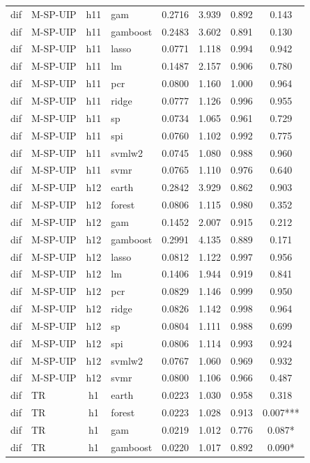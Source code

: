 \begin{ThreePartTable}
\begin{longtable}[t]{llclcccc}
dif & M-SP-UIP & h11 & gam & 0.2716 & 3.939 & 0.892 & 0.143\\
dif & M-SP-UIP & h11 & gamboost & 0.2483 & 3.602 & 0.891 & 0.130\\
dif & M-SP-UIP & h11 & lasso & 0.0771 & 1.118 & 0.994 & 0.942\\
dif & M-SP-UIP & h11 & lm & 0.1487 & 2.157 & 0.906 & 0.780\\
dif & M-SP-UIP & h11 & pcr & 0.0800 & 1.160 & 1.000 & 0.964\\
dif & M-SP-UIP & h11 & ridge & 0.0777 & 1.126 & 0.996 & 0.955\\
dif & M-SP-UIP & h11 & sp & 0.0734 & 1.065 & 0.961 & 0.729\\
dif & M-SP-UIP & h11 & spi & 0.0760 & 1.102 & 0.992 & 0.775\\
dif & M-SP-UIP & h11 & svmlw2 & 0.0745 & 1.080 & 0.988 & 0.960\\
dif & M-SP-UIP & h11 & svmr & 0.0765 & 1.110 & 0.976 & 0.640\\
\addlinespace
dif & M-SP-UIP & h12 & earth & 0.2842 & 3.929 & 0.862 & 0.903\\
dif & M-SP-UIP & h12 & forest & 0.0806 & 1.115 & 0.980 & 0.352\\
dif & M-SP-UIP & h12 & gam & 0.1452 & 2.007 & 0.915 & 0.212\\
dif & M-SP-UIP & h12 & gamboost & 0.2991 & 4.135 & 0.889 & 0.171\\
dif & M-SP-UIP & h12 & lasso & 0.0812 & 1.122 & 0.997 & 0.956\\
dif & M-SP-UIP & h12 & lm & 0.1406 & 1.944 & 0.919 & 0.841\\
dif & M-SP-UIP & h12 & pcr & 0.0829 & 1.146 & 0.999 & 0.950\\
dif & M-SP-UIP & h12 & ridge & 0.0826 & 1.142 & 0.998 & 0.964\\
dif & M-SP-UIP & h12 & sp & 0.0804 & 1.111 & 0.988 & 0.699\\
dif & M-SP-UIP & h12 & spi & 0.0806 & 1.114 & 0.993 & 0.924\\
dif & M-SP-UIP & h12 & svmlw2 & 0.0767 & 1.060 & 0.969 & 0.932\\
dif & M-SP-UIP & h12 & svmr & 0.0800 & 1.106 & 0.966 & 0.487\\
\addlinespace
dif & TR & h1 & earth & 0.0223 & 1.030 & 0.958 & 0.318\\
dif & TR & h1 & forest & 0.0223 & 1.028 & 0.913 & 0.007***\\
dif & TR & h1 & gam & 0.0219 & 1.012 & 0.776 & 0.087*\\
dif & TR & h1 & gamboost & 0.0220 & 1.017 & 0.892 & 0.090*\\

\end{longtable}
\end{ThreePartTable}
